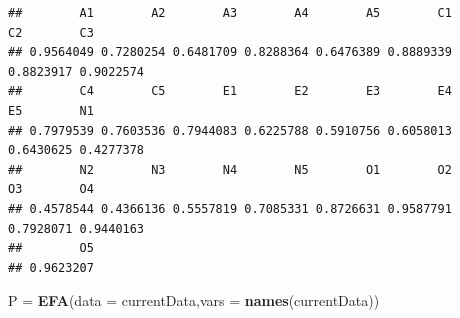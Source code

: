 \documentclass[
]{ctexart}
\newenvironment{Shaded}{\begin{snugshade}}{\end{snugshade}}
\newcommand{\AttributeTok}[1]{\textcolor[rgb]{0.13,0.29,0.53}{#1}}
\newcommand{\CommentTok}[1]{\textcolor[rgb]{0.56,0.35,0.01}{\textit{#1}}}
\newcommand{\DecValTok}[1]{\textcolor[rgb]{0.00,0.00,0.81}{#1}}
\newcommand{\FunctionTok}[1]{\textcolor[rgb]{0.13,0.29,0.53}{\textbf{#1}}}
\newcommand{\NormalTok}[1]{#1}
\newcommand{\OtherTok}[1]{\textcolor[rgb]{0.56,0.35,0.01}{#1}}
\newcommand{\SpecialCharTok}[1]{\textcolor[rgb]{0.81,0.36,0.00}{\textbf{#1}}}
\begin{document}
\begin{Shaded}
\end{Shaded}

\begin{verbatim}
##        A1        A2        A3        A4        A5        C1        C2        C3 
## 0.9564049 0.7280254 0.6481709 0.8288364 0.6476389 0.8889339 0.8823917 0.9022574 
##        C4        C5        E1        E2        E3        E4        E5        N1 
## 0.7979539 0.7603536 0.7944083 0.6225788 0.5910756 0.6058013 0.6430625 0.4277378 
##        N2        N3        N4        N5        O1        O2        O3        O4 
## 0.4578544 0.4366136 0.5557819 0.7085331 0.8726631 0.9587791 0.7928071 0.9440163 
##        O5 
## 0.9623207
\end{verbatim}

\begin{Shaded}
\begin{Highlighting}[]
\NormalTok{P }\OtherTok{=} \FunctionTok{EFA}\NormalTok{(}\AttributeTok{data =}\NormalTok{ currentData,}\AttributeTok{vars =} \FunctionTok{names}\NormalTok{(currentData))}
\end{Highlighting}
\end{Shaded}
\end{document}
